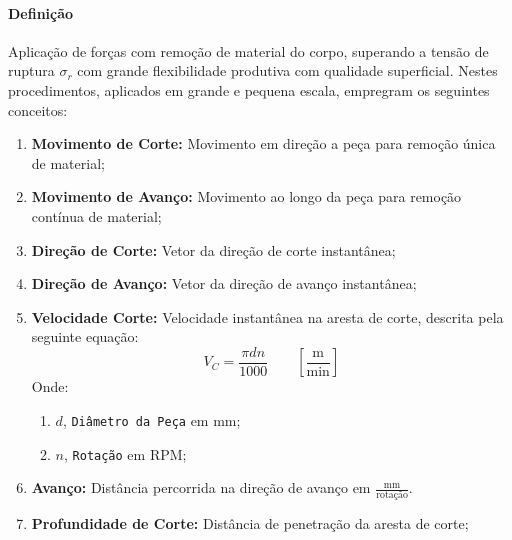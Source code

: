 \documentclass{article}
\begin{document}
            \paragraph{Definição}Aplicação de forças com remoção de material do corpo, superando a tensão de ruptura $\sigma_{r}$ com grande flexibilidade produtiva com qualidade superficial. Nestes procedimentos, aplicados em grande e pequena escala, empregram os seguintes conceitos:
                \begin{enumerate}[rightmargin = \leftmargin, noitemsep]
                    \item \textbf{Movimento de Corte:} Movimento em direção a peça para remoção única de material;

                    \item \textbf{Movimento de Avanço:} Movimento ao longo da peça para remoção contínua de material;

                    \item \textbf{Direção de Corte:} Vetor da direção de corte instantânea;

                    \item \textbf{Direção de Avanço:} Vetor da direção de avanço instantânea;

                    \item \textbf{Velocidade Corte:} Velocidade instantânea na aresta de corte, descrita pela seguinte equação:
                        \begin{equation}
                            \boxed{
                                V_{C} = \frac{\pi d n }{1000}
                                \qquad
                                \left[
                                    \frac{\text{m}}{\text{min}}\right]
                            }
                        \end{equation}
                    Onde:
                        \begin{enumerate}[rightmargin = \leftmargin, noitemsep]
                            \item $d$, \texttt{Diâmetro da Peça} em mm;
                            \item $n$, \texttt{Rotação} em RPM;
                        \end{enumerate}

                    \item \textbf{Avanço:} Distância percorrida na direção de avanço em $\frac{\text{mm}}{\text{rotação}}$.

                    \item \textbf{Profundidade de Corte:} Distância de penetração da aresta de corte;
                \end{enumerate}
\end{document}
